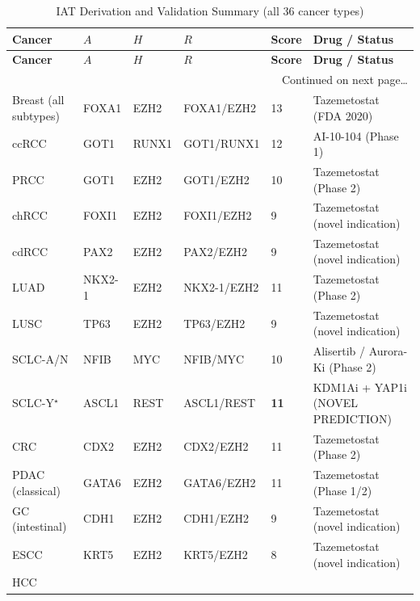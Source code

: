 \documentclass[11pt, a4paper]{article}
\begin{document}
\begin{longtable}{p{3.0cm}p{1.4cm}p{1.4cm}p{1.5cm}p{1.0cm}p{2.8cm}}
\caption{IAT Derivation and Validation Summary
         (all 36 cancer types)}
\label{tab:validation} \\
\toprule
\textbf{Cancer} &
\textbf{$A$} &
\textbf{$H$} &
\textbf{$R$} &
\textbf{Score} &
\textbf{Drug / Status} \\
\midrule
\endfirsthead
\toprule
\textbf{Cancer} &
\textbf{$A$} &
\textbf{$H$} &
\textbf{$R$} &
\textbf{Score} &
\textbf{Drug / Status} \\
\midrule
\endhead
\midrule
\multicolumn{6}{r}{\footnotesize Continued on next page\ldots}\\
\endfoot
\bottomrule
\endlastfoot
Breast (all subtypes)
  & FOXA1 & EZH2 & FOXA1/EZH2
  & 13 & Tazemetostat (FDA 2020) \\
ccRCC
  & GOT1 & RUNX1 & GOT1/RUNX1
  & 12 & AI-10-104 (Phase 1) \\
PRCC
  & GOT1 & EZH2 & GOT1/EZH2
  & 10 & Tazemetostat (Phase 2) \\
chRCC
  & FOXI1 & EZH2 & FOXI1/EZH2
  & 9 & Tazemetostat (novel
       indication) \\
cdRCC
  & PAX2 & EZH2 & PAX2/EZH2
  & 9 & Tazemetostat (novel
       indication) \\
LUAD
  & NKX2-1 & EZH2 & NKX2-1/EZH2
  & 11 & Tazemetostat (Phase 2) \\
LUSC
  & TP63 & EZH2 & TP63/EZH2
  & 9 & Tazemetostat (novel
       indication) \\
SCLC-A/N
  & NFIB & MYC & NFIB/MYC
  & 10 & Alisertib / Aurora-Ki
       (Phase 2) \\
SCLC-Y$^\star$
  & ASCL1 & REST & ASCL1/REST
  & \textbf{11} & KDM1Ai + YAP1i
       (NOVEL PREDICTION) \\
CRC
  & CDX2 & EZH2 & CDX2/EZH2
  & 11 & Tazemetostat (Phase 2) \\
PDAC (classical)
  & GATA6 & EZH2 & GATA6/EZH2
  & 11 & Tazemetostat (Phase 1/2) \\
GC (intestinal)
  & CDH1 & EZH2 & CDH1/EZH2
  & 9 & Tazemetostat (novel
       indication) \\
ESCC
  & KRT5 & EZH2 & KRT5/EZH2
  & 8 & Tazemetostat (novel
       indication) \\
HCC

\end{longtable}
\end{document}
